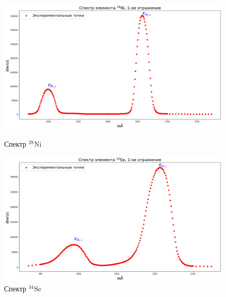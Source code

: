 \documentclass[a4paper, 12pt]{article}%
\begin{document}
	\newpage

		\begin{figure}[h]
			\begin{minipage}[h]{0.49\textwidth}
				\begin{center}
					\includegraphics[width=1.02\linewidth]{Спектры/Ni.png}
					\caption{Спектр $^{28}$Ni}
				\end{center}
			\end{minipage}
			\hfill
			\begin{minipage}[h]{0.49\textwidth}
				\begin{center}
					\includegraphics[width=1.02\linewidth]{Спектры/Se.png}
					\caption{Спектр $^{34}$Se}
				\end{center}
			\end{minipage}
		\end{figure}
\end{document}
